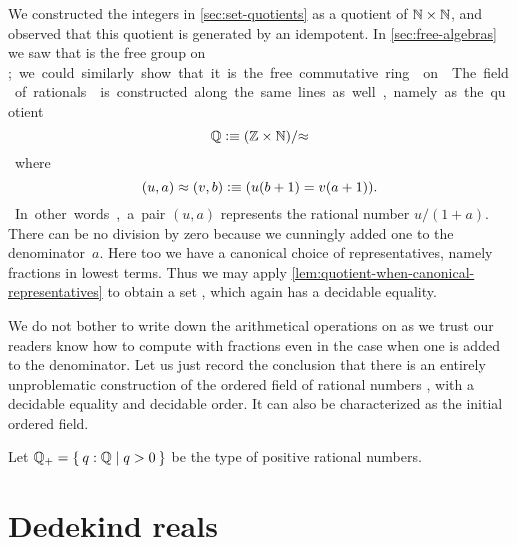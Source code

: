 We constructed the integers \Z in \autoref{sec:set-quotients} as a quotient of $\mathbb{N}\times
\mathbb{N}$, and observed that this quotient is generated by an idempotent. In
\autoref{sec:free-algebras} we saw that \Z is the free group on \unit; we could similarly
show that it is the free commutative ring on \emptyt. The field of rationals \Q is
constructed along the same lines as well, namely as the quotient
%
\[ \mathbb{Q} \vcentcolon\equiv (\mathbb{Z} \times \mathbb{N})/{\approx} \]
%
where
\[ (u,a) \approx (v,b) \vcentcolon\equiv (u (b + 1) = v (a + 1)). \]
%
In other words, a pair $(u, a)$ represents the rational number $u / (1 + a)$. There can be
no division by zero because we cunningly added one to the denominator~$a$. Here too we
have a canonical choice of representatives, namely fractions in lowest terms. Thus we may
apply \autoref{lem:quotient-when-canonical-representatives} to obtain a set \Q, which
again has a decidable equality.
%

We do not bother to write down the arithmetical operations on \Q as we trust our readers
know how to compute with fractions even in the case when one is added to the denominator.
Let us just record the conclusion that there is an entirely unproblematic construction of
the ordered field of rational numbers \Q, with a decidable equality and decidable order.
It can also be characterized as the initial ordered field.
%

%
%
Let $\Qp = \setof{ q : \Q | q > 0 }$ be the type of positive rational numbers.

\section{Dedekind reals}
\label{sec:dedekind-reals}

